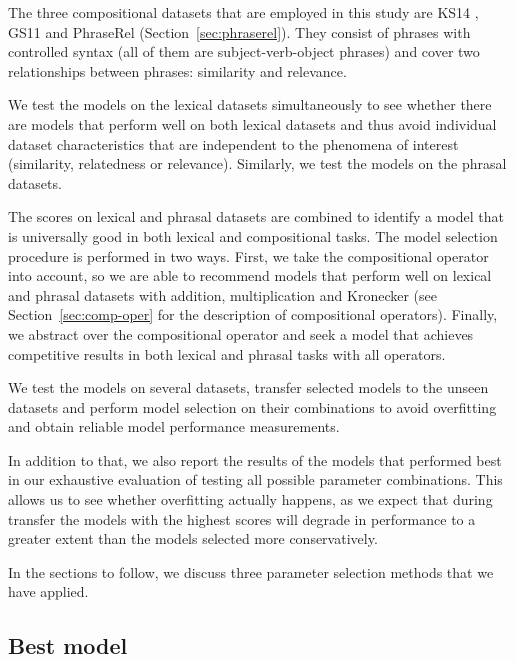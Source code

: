 The three compositional datasets that are employed in this study are KS14 \cite{kartsadrqpl2014}, GS11 \cite{Grefenstette:2011:ESC:2145432.2145580} and PhraseRel (Section~\ref{sec:phraserel}). They consist of phrases with controlled syntax (all of them are subject-verb-object phrases) and cover two relationships between phrases: similarity and relevance.

We test the models on the lexical datasets simultaneously to see whether there are models that perform well on both lexical datasets and thus avoid individual dataset characteristics that are independent to the phenomena of interest (similarity, relatedness or relevance). Similarly, we test the models on the phrasal datasets.

The scores on lexical and phrasal datasets are combined to identify a model that is universally good in both lexical and compositional tasks. The model selection procedure is performed in two ways. First, we take the compositional operator into account, so we are able to recommend models that perform well on lexical and phrasal datasets with addition, multiplication and Kronecker (see Section~\ref{sec:comp-oper} for the description of compositional operators). Finally, we abstract over the compositional operator and seek a model that achieves competitive results in both lexical and phrasal tasks with all operators.
%

We test the models on several datasets, transfer selected models to the unseen datasets and perform model selection on their combinations to avoid overfitting and obtain reliable model performance measurements.

In addition to that, we also report the results of the models that performed best in our exhaustive evaluation of testing all possible parameter combinations. This allows us to see whether overfitting actually happens, as we expect that during transfer the models with the highest scores will degrade in performance to a greater extent than the models selected more conservatively.

In the sections to follow, we discuss three parameter selection methods that we have applied.

\subsection{Best model}

